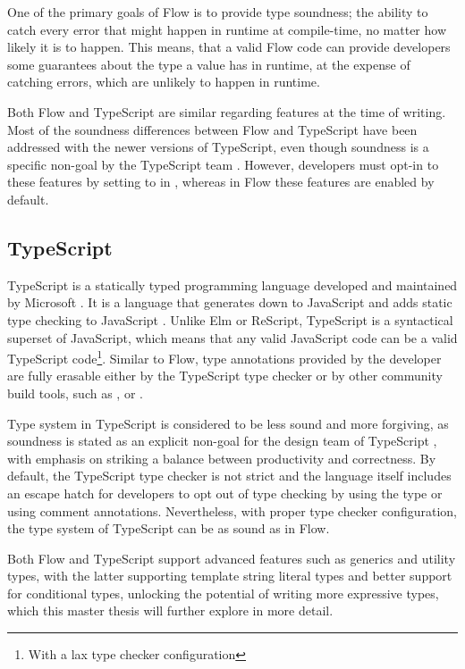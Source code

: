 One of the primary goals of Flow is to provide type soundness; the ability to catch every error that might happen in runtime at compile-time, no matter how likely it is to happen. This means, that a valid Flow code can provide developers some guarantees about the type a value has in runtime, at the expense of catching errors, which are unlikely to happen in runtime.

Both Flow and TypeScript are similar regarding features at the time of writing. Most of the soundness differences between Flow and TypeScript have been addressed with the newer versions of TypeScript, even though soundness is a specific non-goal by the TypeScript team \cite{TypeScriptDesignGoals}. However, developers must opt-in to these features by setting  to  in , whereas in Flow these features are enabled by default.

\subsection{TypeScript}

TypeScript is a statically typed programming language developed and maintained by Microsoft \cite{TypeScriptJavaScriptSyntax}. It is a language that generates down to JavaScript and adds static type checking to JavaScript \cite{DocumentationTypeScriptJavaScript}. Unlike Elm or ReScript, TypeScript is a syntactical superset of JavaScript, which means that any valid JavaScript code can be a valid TypeScript code\footnote{With a lax type checker configuration}. Similar to Flow, type annotations provided by the developer are fully erasable either by the TypeScript  type checker or by other community build tools, such as \cite{BabelCompilerNext}, \cite{EsbuildExtremelyFast} or \cite{SWCRustbasedPlatform}.

Type system in TypeScript is considered to be less sound and more forgiving, as soundness is stated as an explicit non-goal for the design team of TypeScript \cite{TypeScriptDesignGoals}, with emphasis on striking a balance between productivity and correctness. By default, the TypeScript type checker is not strict and the language itself includes an escape hatch for developers to opt out of type checking by using the  type or using  comment annotations. Nevertheless, with proper type checker configuration, the type system of TypeScript can be as sound as in Flow.

Both Flow and TypeScript support advanced features such as generics and utility types, with the latter supporting template string literal types and better support for conditional types, unlocking the potential of writing more expressive types, which this master thesis will further explore in more detail.

